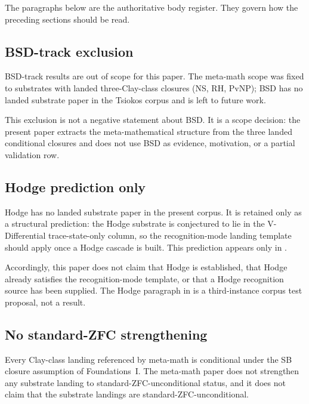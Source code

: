 \documentclass[11pt]{article}
\theoremstyle{definition}
\begin{document}
The paragraphs below are the authoritative body register.  They govern
how the preceding sections should be read.

\subsection{BSD-track exclusion}\label{sec:scope:bsd-out}

BSD-track results are out of scope for this paper.  The meta-math
scope was fixed to substrates with landed three-Clay-class closures
(NS, RH, PvNP); BSD \cite{Wiles2000BSD} has no landed substrate paper
in the Tsiokos corpus and is left to future work.

This exclusion is not a negative statement about BSD.  It is a scope
decision: the present paper extracts the meta-mathematical structure
from the three landed conditional closures and does not use BSD as
evidence, motivation, or a partial validation row.

\subsection{Hodge prediction only}\label{sec:scope:hodge-prediction-only}

Hodge has no landed substrate paper in the present corpus.  It is
retained only as a structural prediction: the Hodge substrate is
conjectured to lie in the V-Differential trace-state-only column, so
the recognition-mode landing template should apply once a Hodge
cascade is built.  This prediction appears only in
.

Accordingly, this paper does not claim that Hodge is established, that
Hodge already satisfies the recognition-mode template, or that a Hodge
recognition source has been supplied.  The Hodge paragraph in
 is a third-instance corpus test proposal, not
a result.

\subsection{No standard-ZFC strengthening}\label{sec:scope:standard-zfc}

Every Clay-class landing referenced by meta-math is conditional under
the SB closure assumption of Foundations~I.  The meta-math paper does
not strengthen any substrate landing to standard-ZFC-unconditional
status, and it does not claim that the substrate landings are
standard-ZFC-unconditional.
\end{document}
